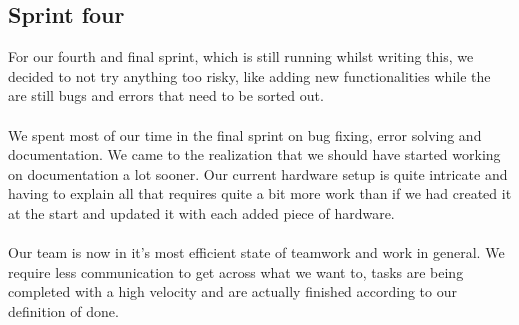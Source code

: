 \documentclass[12pt]{article}
\begin{document}
	\subsection{Sprint four}
	For our fourth and final sprint, which is still running whilst writing this, we decided to not try anything too risky, like adding new functionalities while the are still bugs and errors that need to be sorted out.\\
	\\We spent most of our time in the final sprint on bug fixing, error solving and documentation. We came to the realization that we should have started working on documentation a lot sooner. Our current hardware setup is quite intricate and having to explain all that requires quite a bit more work than if we had created it at the start and updated it with each added piece of hardware.\\
	\\Our team is now in it's most efficient state of teamwork and work in general. We require less communication to get across what we want to, tasks are being completed with a high velocity and are actually finished according to our definition of done.
\end{document}
